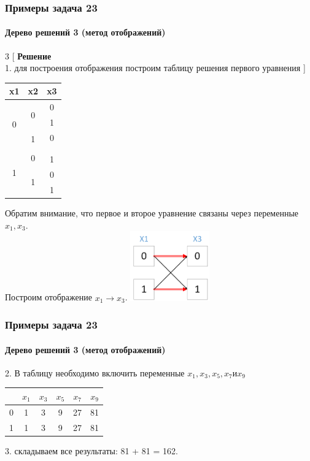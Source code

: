 \begin{frame}[t]
\frametitle{Примеры задача 23}
\framesubtitle{Дерево решений 3 (метод отображений)}
\setlength{\columnsep}{0.4cm}
\begin{multicols}{3}
[
\textbf{Решение}\\
1.	для построения отображения построим таблицу решения первого уравнения
]
 
\begin{tabular}{|c|c|c|}
\hline 
x1 & x2 & x3\tabularnewline
\hline 
\multirow{4}{*}{0} & \multirow{2}{*}{0} & 0\tabularnewline
\cline{3-3} 
 &  & 1\tabularnewline
\cline{2-3} \cline{3-3} 
 & \multirow{2}{*}{1} & 0\tabularnewline
\cline{3-3} 
 &  & \tabularnewline
\hline 
\multirow{4}{*}{1} & \multirow{2}{*}{0} & \tabularnewline
\cline{3-3} 
 &  & 1\tabularnewline
\cline{2-3} \cline{3-3} 
 & \multirow{2}{*}{1} & 0\tabularnewline
\cline{3-3} 
 &  & 1\tabularnewline
\hline 
\end{tabular}
 
\columnbreak
 
Обратим внимание, что первое и второе уравнение связаны через переменные $x_1, x_3$. \\Построим отображение $x_1 \rightarrow x_3$.
\columnbreak
\includegraphics[height=3cm]{images/t23_2}
\end{multicols}
	
\end{frame}


\begin{frame}[t]
\frametitle{Примеры задача 23}
\framesubtitle{Дерево решений 3 (метод отображений)}
2.	В таблицу необходимо включить переменные $x_1,x_3,x_5, x_7 и x_9$ 

\begin{tabular}{|c|c|c|c|c|c|}
\hline
 & $x_1$ & $x_3$ & $x_5$ & $x_7$ &  $x_9$ \tabularnewline
\hline
0 & 1 & 3 & 9 & 27 &  81 \tabularnewline
1 & 1 & 3 & 9 & 27 &  81 \tabularnewline
\hline
\end{tabular}
	
3. складываем все результаты: 81 + 81 = 162.

	
\end{frame}


